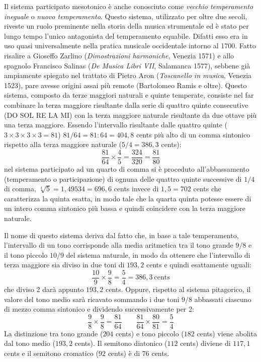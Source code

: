 Il sistema participato mesotonico è anche conosciuto come \emph{vecchio
temperamento ineguale} o \emph{nuovo temperamento}. Questo sistema, utilizzato
per oltre due secoli, riveste un ruolo preminente nella storia della musica
strumentale ed è stato per lungo tempo l'unico antagonista del temperamento
equabile. Difatti esso era in uso quasi universalmente nella pratica musicale
occidentale intorno al 1700. Fatto risalire a Gioseffo Zarlino
(\emph{Dimostrazioni harmoniche}, Venezia 1571) e allo spagnolo Francisco
Salinas (\emph{De Musica Libri VII}, Salamanca 1577), sebbene già ampiamente
spiegato nel trattato di Pietro Aron (\emph{Toscanello in musica}, Venezia
1523), pare avesse origini assai più remote (Bartolomeo Ramis e oltre). Questo
sistema, composto da terze maggiori naturali e quinte temperate, consiste nel
far combinare la terza maggiore risultante dalla serie di quattro quinte
consecutive (DO SOL RE LA MI) con la terza maggiore naturale risultante da due
ottave più una terza maggiore. Essendo l'intervallo risultante dalle quattro
quinte ($3 \times 3 \times 3 \times 3 = 81$) $81/64 = 81:64 = 404{,}8$ cents più
alto di un comma sintonico rispetto alla terza maggiore naturale
($5/4 = 386{,}3$ cents):
\[
  \frac{81}{64} \times \frac{4}{5} = \frac{324}{320} = \frac{81}{80}
\]
nel sistema participato ad un quarto di comma si è proceduto all'abbassamento
(temperamento o participazione) di ognuna delle quattro quinte successive di
$1/4$ di comma, $\sqrt[4]{5} = 1{,}49534 = 696{,}6$ cents invece di $1{,}5 = 702$
cents che caratterizza la quinta esatta, in modo tale che la quarta quinta
potesse essere di un intero comma sintonico più bassa e quindi coincidere con la
terza maggiore naturale.

Il nome di questo sistema deriva dal fatto che, in base a tale temperamento,
l'intervallo di un tono corrisponde alla media aritmetica tra il tono grande
$9/8$ e il tono piccolo $10/9$ del sistema naturale, in modo da ottenere che
l'intervallo di terza maggiore sia diviso in due toni di $193{,}2$ cents e
quindi esattamente uguali:
\[
  \frac{10}{9} \times \frac{9}{8} = \frac{5}{4} = 386{,}3~\text{cents}
\]
che diviso 2 darà appunto $193{,}2$ cents. Oppure, rispetto al sistema
pitagorico, il valore del tono medio sarà ricavato sommando i due toni $9/8$
abbassati ciascuno di mezzo comma sintonico e dividendo successivamente per 2:
\[
  \frac{9}{8} \times \frac{9}{8} = \frac{81}{64}
  \qquad
  \frac{81}{64} \times \frac{80}{81} = \frac{5}{4}
\]
La distinzione tra tono grande ($204$ cents) e tono piccolo ($182$ cents) viene
abolita dal tono medio ($193{,}2$ cents). Il semitono diatonico ($112$ cents)
diviene di $117{,}1$ cents e il semitono cromatico ($92$ cents) è di $76$ cents.


